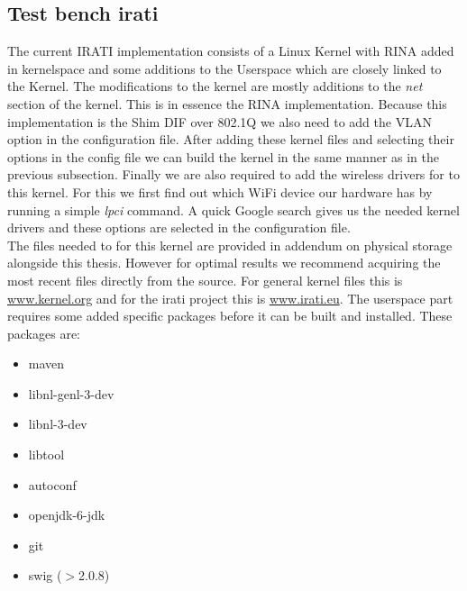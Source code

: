 \subsection{Test bench irati}
\label{ssec:test-bench-irati}


The current IRATI implementation consists of a Linux Kernel with RINA added in kernelspace and some additions to the Userspace which are closely linked to the Kernel. The modifications to the kernel are mostly additions to the \emph{net} section of the kernel. This is in essence the RINA implementation. Because this implementation is the Shim DIF over 802.1Q we also need to add the VLAN option in the configuration file. After adding these kernel files and selecting their options in the config file we can build the kernel in the same manner as in the previous subsection. Finally we are also required to add the wireless drivers for to this kernel. For this we first find out which WiFi device our hardware has by running a simple \emph{lpci} command. A quick Google search gives us the needed kernel drivers and these options are selected in the configuration file. 
\\
The files needed to for this kernel are provided in addendum on physical storage alongside this thesis. However for optimal results we recommend acquiring the most recent files directly from the source. For general kernel files this is \url{www.kernel.org} and for the irati project this is \url{www.irati.eu}. 
\npar
The userspace part requires some added specific packages before it can be built and installed. These packages are:

\begin{itemize}
	\item maven
	\item libnl-genl-3-dev
	\item libnl-3-dev
	\item libtool
	\item autoconf
	\item openjdk-6-jdk
	\item git
	\item swig ($>$2.0.8)
\end{itemize}

